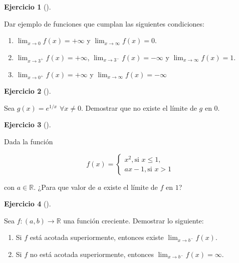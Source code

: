 \documentclass[
  a4paper,
]{scrreport}
\providecommand{\tightlist}{%
  \setlength{\itemsep}{0pt}\setlength{\parskip}{0pt}}\usepackage{longtable,booktabs,array}
\theoremstyle{definition}
\newtheorem{exercise}{Ejercicio}[chapter]
\theoremstyle{remark}
\begin{document}
\leavevmode{}%
\begin{exercise}[]\label{exr-ejemplos-limites-laterales}

Dar ejemplo de funciones que cumplan las siguientes condiciones:

\begin{enumerate}
\def\labelenumi{\alph{enumi}.}
\item
  \(\lim_{x\to 0}f(x)=+\infty\) y \(\lim_{x\to \infty}f(x)=0\).
\item
  \(\lim_{x\to 3^+}f(x)=+\infty\), \(\lim_{x\to 3^-}f(x)=-\infty\) y
  \(\lim_{x\to \infty}f(x)=1\).
\item
  \(\lim_{x\to 0^+}f(x)=+\infty\) y \(\lim_{x\to \infty}f(x)=-\infty\)
\end{enumerate}

\end{exercise}

\leavevmode{}%
\begin{exercise}[]\label{exr-limite-laterales}

Sea \(g(x)=e^{1/x}\) \(\forall x\neq 0\). Demostrar que no existe el
límite de \(g\) en \(0\).

\end{exercise}

\leavevmode{}%
\begin{exercise}[]\label{exr-limites-laterales}

Dada la función

\[
f(x)=\begin{cases}
x^2, \mbox{si } x\leq 1,\\ 
ax-1, \mbox{si } x>1
\end{cases}
\]

con \(a\in\mathbb{R}\). ¿Para que valor de \(a\) existe el límite de
\(f\) en \(1\)?

\end{exercise}

\leavevmode{}%
\begin{exercise}[]\label{exr-limites-funciones-acotadas}

Sea \(f:(a,b)\to \mathbb{R}\) una función creciente. Demostrar lo
siguiente:

\begin{enumerate}
\def\labelenumi{\alph{enumi}.}
\tightlist
\item
  Si \(f\) está acotada superiormente, entonces existe
  \(\lim_{x\to b^-}f(x)\).
\item
  Si \(f\) no está acotada superiormente, entonces
  \(\lim_{x\to b^-}f(x)=\infty\).
\end{enumerate}

\end{exercise}
\end{document}
